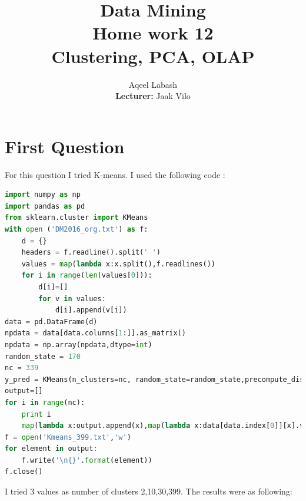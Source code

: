 \documentclass{article}
\title{Data Mining\\
		Home work 12\\Clustering, PCA, OLAP}
\author{Aqeel Labash\\ \textbf{Lecturer:} Jaak Vilo}
\begin{document}
	\maketitle
\section*{First Question}
For this question I tried K-means. I used the following code : 
\begin{lstlisting}[language=Python]
import numpy as np
import pandas as pd
from sklearn.cluster import KMeans
with open ('DM2016_org.txt') as f:
    d = {}
    headers = f.readline().split(' ')
    values = map(lambda x:x.split(),f.readlines())
    for i in range(len(values[0])):
        d[i]=[]
        for v in values:
            d[i].append(v[i])
data = pd.DataFrame(d)
npdata = data[data.columns[1:]].as_matrix()
npdata = np.array(npdata,dtype=int)
random_state = 170
nc = 339
y_pred = KMeans(n_clusters=nc, random_state=random_state,precompute_distances=True).fit_predict(npdata)
output=[]
for i in range(nc):
    print i
    map(lambda x:output.append(x),map(lambda x:data[data.index[0]][x].values,np.where(y_pred==i))[0])
f = open('Kmeans_399.txt','w')
for element in output:
    f.write('\n{}'.format(element))
f.close()
\end{lstlisting}
I tried 3 values as number of clusters 2,10,30,399. The results were as following:
\end{document}
